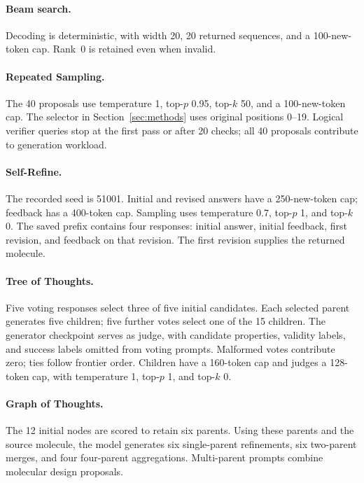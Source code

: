 \paragraph{Beam search.}
Decoding is deterministic, with width 20, 20 returned sequences, and a 100-new-token cap. Rank~0 is retained even when invalid.

\paragraph{Repeated Sampling.}
The 40 proposals use temperature 1, top-$p$ 0.95, top-$k$ 50, and a 100-new-token cap. The selector in Section~\ref{sec:methods} uses original positions 0--19. Logical verifier queries stop at the first pass or after 20 checks; all 40 proposals contribute to generation workload.

\paragraph{Self-Refine.}
The recorded seed is 51001. Initial and revised answers have a 250-new-token cap; feedback has a 400-token cap. Sampling uses temperature 0.7, top-$p$ 1, and top-$k$ 0. The saved prefix contains four responses: initial answer, initial feedback, first revision, and feedback on that revision. The first revision supplies the returned molecule.

\paragraph{Tree of Thoughts.}
\label{app:tot-scope}
Five voting responses select three of five initial candidates. Each selected parent generates five children; five further votes select one of the 15 children. The generator checkpoint serves as judge, with candidate properties, validity labels, and success labels omitted from voting prompts. Malformed votes contribute zero; ties follow frontier order. Children have a 160-token cap and judges a 128-token cap, with temperature 1, top-$p$ 1, and top-$k$ 0.

\paragraph{Graph of Thoughts.}
The 12 initial nodes are scored to retain six parents. Using these parents and the source molecule, the model generates six single-parent refinements, six two-parent merges, and four four-parent aggregations. Multi-parent prompts combine molecular design proposals.

